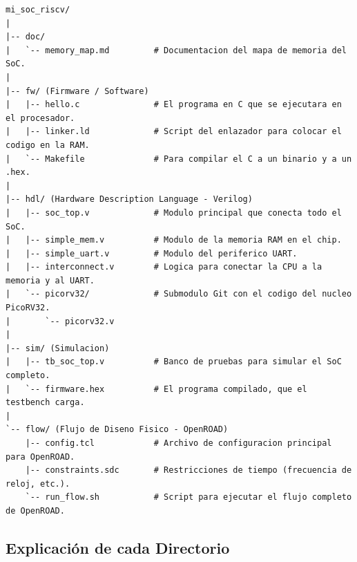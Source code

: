 \documentclass[12pt,a4paper]{article}
\begin{document}
\begin{verbatim}
mi_soc_riscv/
|
|-- doc/
|   `-- memory_map.md         # Documentacion del mapa de memoria del SoC.
|
|-- fw/ (Firmware / Software)
|   |-- hello.c               # El programa en C que se ejecutara en el procesador.
|   |-- linker.ld             # Script del enlazador para colocar el codigo en la RAM.
|   `-- Makefile              # Para compilar el C a un binario y a un .hex.
|
|-- hdl/ (Hardware Description Language - Verilog)
|   |-- soc_top.v             # Modulo principal que conecta todo el SoC.
|   |-- simple_mem.v          # Modulo de la memoria RAM en el chip.
|   |-- simple_uart.v         # Modulo del periferico UART.
|   |-- interconnect.v        # Logica para conectar la CPU a la memoria y al UART.
|   `-- picorv32/             # Submodulo Git con el codigo del nucleo PicoRV32.
|       `-- picorv32.v
|
|-- sim/ (Simulacion)
|   |-- tb_soc_top.v          # Banco de pruebas para simular el SoC completo.
|   `-- firmware.hex          # El programa compilado, que el testbench carga.
|
`-- flow/ (Flujo de Diseno Fisico - OpenROAD)
    |-- config.tcl            # Archivo de configuracion principal para OpenROAD.
    |-- constraints.sdc       # Restricciones de tiempo (frecuencia de reloj, etc.).
    `-- run_flow.sh           # Script para ejecutar el flujo completo de OpenROAD.
\end{verbatim}

\subsection{Explicación de cada Directorio}
\end{document}
